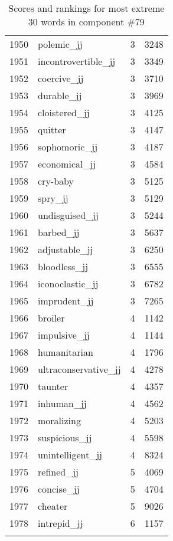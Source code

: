 \begin{longtable}[!htbp]{| rlr@{.}l |}
    1950 & polemic\_jj & 3 & 3248 \\
    1951 & incontrovertible\_jj & 3 & 3349 \\
    1952 & coercive\_jj & 3 & 3710 \\
    1953 & durable\_jj & 3 & 3969 \\
    1954 & cloistered\_jj & 3 & 4125 \\
    1955 & quitter & 3 & 4147 \\
    1956 & sophomoric\_jj & 3 & 4187 \\
    1957 & economical\_jj & 3 & 4584 \\
    1958 & cry-baby & 3 & 5125 \\
    1959 & spry\_jj & 3 & 5129 \\
    1960 & undisguised\_jj & 3 & 5244 \\
    1961 & barbed\_jj & 3 & 5637 \\
    1962 & adjustable\_jj & 3 & 6250 \\
    1963 & bloodless\_jj & 3 & 6555 \\
    1964 & iconoclastic\_jj & 3 & 6782 \\
    1965 & imprudent\_jj & 3 & 7265 \\
    1966 & broiler & 4 & 1142 \\
    1967 & impulsive\_jj & 4 & 1144 \\
    1968 & humanitarian & 4 & 1796 \\
    1969 & ultraconservative\_jj & 4 & 4278 \\
    1970 & taunter & 4 & 4357 \\
    1971 & inhuman\_jj & 4 & 4562 \\
    1972 & moralizing & 4 & 5203 \\
    1973 & suspicious\_jj & 4 & 5598 \\
    1974 & unintelligent\_jj & 4 & 8324 \\
    1975 & refined\_jj & 5 & 4069 \\
    1976 & concise\_jj & 5 & 4704 \\
    1977 & cheater & 5 & 9026 \\
    1978 & intrepid\_jj & 6 & 1157 \\
    \hline
    \caption{Scores and rankings for most extreme 30 words in component \#79} \\
\end{longtable}
